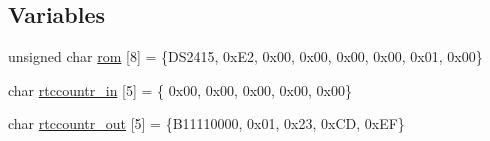 \subsection*{Variables}
\begin{DoxyCompactItemize}
\item 
unsigned char \hyperlink{OWGeneric_8ino_a8beb78e2b3f2cb6e34f34861a875ca0b}{rom} \mbox{[}8\mbox{]} = \{D\-S2415, 0x\-E2, 0x00, 0x00, 0x00, 0x00, 0x01, 0x00\}
\item 
char \hyperlink{OWGeneric_8ino_a81a94fdcf5fd0721c26e50dd4cd32b1e}{rtccountr\-\_\-in} \mbox{[}5\mbox{]} = \{ 0x00, 0x00, 0x00, 0x00, 0x00\}
\item 
char \hyperlink{OWGeneric_8ino_ac150db4005f4bac8510f9e697f1c291a}{rtccountr\-\_\-out} \mbox{[}5\mbox{]} = \{B11110000, 0x01, 0x23, 0x\-C\-D, 0x\-E\-F\}
\end{DoxyCompactItemize}


